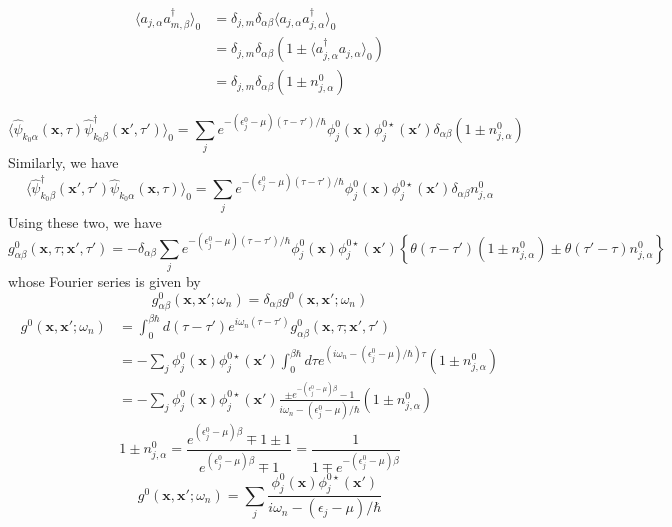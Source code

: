 \[
\begin{aligned}
\langle a_{j,\alpha}a^\dag_{m,\beta}\rangle_0&=\delta_{j,m}\delta_{\alpha\beta} \langle a_{j,\alpha}a^\dag_{j,\alpha}\rangle_0\\
&=\delta_{j,m}\delta_{\alpha\beta}(1\pm \langle a^\dag_{j,\alpha}a_{j,\alpha}\rangle_0)\\
&=\delta_{j,m}\delta_{\alpha\beta} (1\pm n^0_{j,\alpha})
\end{aligned}
\]

\[
\langle \hat{\psi}_{k_0\alpha}(\mathbf{x},\tau) \hat{\psi}_{k_0\beta}^\dag(\mathbf{x}',\tau')\rangle_0
=\sum_{j}e^{-(\epsilon^0_j-\mu)(\tau-\tau')/\hbar} \phi_j^0(\mathbf{x})\phi_j^{0\star}(\mathbf{x}') \delta_{\alpha\beta} (1\pm n^0_{j,\alpha})
\]
Similarly, we have
\[
\langle \hat{\psi}_{k_0\beta}^\dag(\mathbf{x}',\tau') \hat{\psi}_{k_0\alpha}(\mathbf{x},\tau)\rangle_0
=\sum_{j}e^{-(\epsilon^0_j-\mu)(\tau-\tau')/\hbar} \phi_j^0(\mathbf{x})\phi_j^{0\star}(\mathbf{x}')\delta_{\alpha\beta} n^0_{j,\alpha}
\]
Using these two, we have
\begin{equation}
g_{\alpha\beta}^0(\mathbf{x},\tau;\mathbf{x}',\tau')=-\delta_{\alpha\beta}\sum_j e^{-(\epsilon^0_j-\mu)(\tau-\tau')/\hbar} \phi_j^0(\mathbf{x})\phi_j^{0\star}(\mathbf{x}') \left\{ \theta(\tau-\tau') (1 \pm n^0_{j,\alpha}) \pm \theta(\tau'-\tau)n_{j,\alpha}^0 \right\}
\end{equation}
whose Fourier series is given by
\[
g_{\alpha\beta}^0(\mathbf{x},\mathbf{x}';\omega_n)=\delta_{\alpha\beta}g^0(\mathbf{x},\mathbf{x}';\omega_n)
\]
\[
\begin{aligned}
g^0(\mathbf{x},\mathbf{x}';\omega_n)&=\int^{\beta\hbar}_0 d(\tau-\tau')e^{i\omega_n(\tau-\tau')}g^0_{\alpha\beta}(\mathbf{x},\tau;\mathbf{x}',\tau')\\
&=-\sum_j \phi_j^0(\mathbf{x})\phi_j^{0\star}(\mathbf{x}') \int^{\beta\hbar}_0 d\tau e^{(i\omega_n-(\epsilon_j^0-\mu)/\hbar) \tau} (1\pm n^0_{j,\alpha})\\
&=-\sum_j \phi_j^0(\mathbf{x})\phi_j^{0\star}(\mathbf{x}') \frac{\pm e^{-(\epsilon_j^0-\mu)\beta}-1}{i\omega_n-(\epsilon_j^0-\mu)/\hbar } (1\pm n^0_{j,\alpha})
\end{aligned}
\]
\[
1\pm n^0_{j,\alpha}=\frac{ e^{(\epsilon_j^0-\mu)\beta}\mp1 \pm 1}{ e^{(\epsilon_j^0-\mu)\beta}\mp1}=\frac{1}{ 1\mp e^{-(\epsilon_j^0-\mu)\beta}}
\]
\begin{equation}
g^0(\mathbf{x},\mathbf{x}';\omega_n)=\sum_j \frac{\phi_j^0(\mathbf{x})\phi_j^{0\star}(\mathbf{x}')}{i\omega_n-(\epsilon_j-\mu)/\hbar}
\end{equation}
